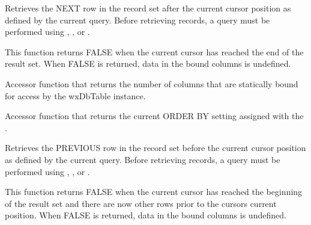 Retrieves the NEXT row in the record set after the current cursor position 
as defined by the current query.  Before retrieving records, a query must be 
performed using , 
, 
 or 
.


This function returns FALSE when the current cursor has reached the end of 
the result set.  When FALSE is returned, data in the bound columns is 
undefined.



\label{wxdbtablegetnumberofcolumns}


Accessor function that returns the number of columns that are statically 
bound for access by the wxDbTable instance.


\label{wxdbtablegetorderbyclause}


Accessor function that returns the current ORDER BY setting assigned with 
the .




\label{wxdbtablegetprev}


Retrieves the PREVIOUS row in the record set before the current cursor 
position as defined by the current query.  Before retrieving records, a 
query must be performed using , 
, 
 or 
.


This function returns FALSE when the current cursor has reached the beginning 
of the result set and there are now other rows prior to the cursors current 
position.  When FALSE is returned, data in the bound columns is undefined.

